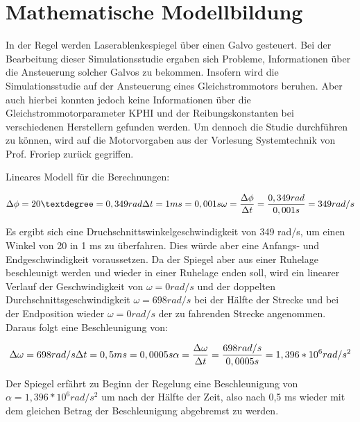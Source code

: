 \newpage




\chapter{Mathematische Modellbildung}
\label{chap:Modellbildung}

In der Regel werden Laserablenkespiegel über einen Galvo gesteuert. Bei der Bearbeitung dieser Simulationsstudie ergaben sich Probleme, Informationen über die Ansteuerung
solcher Galvos zu bekommen. Insofern wird die Simulationsstudie auf der Ansteuerung eines Gleichstrommotors beruhen. Aber auch hierbei konnten jedoch keine Informationen 
über die Gleichstrommotorparameter KPHI und der Reibungskonstanten bei verschiedenen Herstellern gefunden werden. Um dennoch die Studie durchführen zu können, wird auf die
Motorvorgaben aus der Vorlesung Systemtechnik von Prof. Froriep zurück gegriffen.

Lineares Modell für die Berechnungen:

\begin{center}
\begin{equation}
\Delta \phi = 20{\textdegree} = 0,349 rad\\
\Delta t = 1 ms = 0,001 s\\
\omega = \frac {\Delta \phi}{\Delta t} = \frac {0,349 rad}{0,001 s} = 349 rad/s\\
\end{equation}
\end{center}
Es ergibt sich eine Druchschnittswinkelgeschwindigkeit von 349 rad/s, um einen Winkel von 20{\textdegree} in 1 ms zu überfahren.
Dies würde aber eine Anfangs- und Endgeschwindigkeit voraussetzen. Da der Spiegel aber aus einer Ruhelage beschleunigt werden und wieder in einer Ruhelage enden soll, 
wird ein linearer Verlauf der Geschwindigkeit von $\omega = 0 rad/s$ und der doppelten Durchschnittsgeschwindigkeit $\omega = 698 rad/s$ bei der Hälfte der Strecke und bei 
der Endposition wieder $\omega = 0 rad/s$ der zu fahrenden Strecke angenommen. 
Daraus folgt eine Beschleunigung von:
\begin{center}
\begin{equation}
\Delta \omega = 698 rad/s\\
\Delta t = 0,5 ms = 0,0005 s\\
\alpha = \frac {\Delta \omega}{\Delta t} = \frac {698 rad/s}{0,0005 s} = 1,396 *10^6 rad/s^2\\
\end{equation}
\end{center}
Der Spiegel erfährt zu Beginn der Regelung eine Beschleunigung von $\alpha = 1,396 *10^6 rad/s^2$ um nach der Hälfte der Zeit, also nach 0,5 ms wieder mit dem gleichen
Betrag der Beschleunigung abgebremst zu werden.

